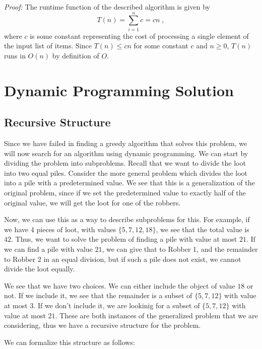 \documentclass{article}
\begin{document}
\textit{Proof:} The runtime function of the described algorithm is given by
\[
	T(n) = \sum_{i=1}^{n} c = cn \;,
\]
where $c$ is some constant representing the cost of processing a single element of the input list of items. Since $T(n) \leq cn$ for some constant $c$ and $n \geq 0$, $T(n)$ runs in $O(n)$ by definition of $O$.

\section{Dynamic Programming Solution}

\subsection{Recursive Structure}

Since we have failed in finding a greedy algorithm that solves this problem, we will now search for an algorithm using dynamic programming.  We can start by dividing the problem into subproblems.  Recall that we want to divide the loot into two equal piles.  Consider the more general problem which divides the loot into a pile with a predetermined value.  We see that this is a generalization of the original problem, since if we set the predetermined value to exactly half of the original value, we will get the loot for one of the robbers.

Now, we can use this as a way to describe subproblems for this.  For example, if we have 4 pieces of loot, with values $\{5,7,12,18\}$, we see that the total value is $42$.  Thus, we want to solve the problem of finding a pile with value at most $21$.  If we can find a pile with value $21$, we can give that to Robber 1, and the remainder to Robber 2 in an equal division, but if such a pile does not exist, we cannot divide the loot equally.

We see that we have two choices.  We can either include the object of value $18$ or not.  If we include it, we see that the remainder is a subset of $\{5,7,12\}$ with value at most $3$.  If we don't include it, we are lookinig for a subset of $\{5,7,12\}$ with value at most $21$.  These are both instances of the generalized problem that we are considering, thus we have a recursive structure for the problem.

We can formalize this structure as follows:
\end{document}
